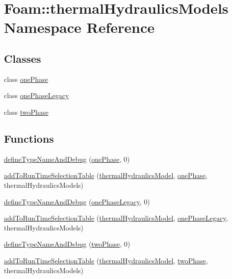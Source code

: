 \hypertarget{namespaceFoam_1_1thermalHydraulicsModels}{}\section{Foam\+:\+:thermal\+Hydraulics\+Models Namespace Reference}
\label{namespaceFoam_1_1thermalHydraulicsModels}
\subsection*{Classes}
\begin{DoxyCompactItemize}
\item 
class \hyperlink{classFoam_1_1thermalHydraulicsModels_1_1onePhase}{one\+Phase}
\item 
class \hyperlink{classFoam_1_1thermalHydraulicsModels_1_1onePhaseLegacy}{one\+Phase\+Legacy}
\item 
class \hyperlink{classFoam_1_1thermalHydraulicsModels_1_1twoPhase}{two\+Phase}
\end{DoxyCompactItemize}
\subsection*{Functions}
\begin{DoxyCompactItemize}
\item 
\hyperlink{namespaceFoam_1_1thermalHydraulicsModels_a3eb0fd84f7fb16a851ba94442762080c}{define\+Type\+Name\+And\+Debug} (\hyperlink{classFoam_1_1thermalHydraulicsModels_1_1onePhase}{one\+Phase}, 0)
\item 
\hyperlink{namespaceFoam_1_1thermalHydraulicsModels_a55e34558094e1b6bbe1955c67027a868}{add\+To\+Run\+Time\+Selection\+Table} (\hyperlink{classFoam_1_1thermalHydraulicsModel}{thermal\+Hydraulics\+Model}, \hyperlink{classFoam_1_1thermalHydraulicsModels_1_1onePhase}{one\+Phase}, thermal\+Hydraulics\+Models)
\item 
\hyperlink{namespaceFoam_1_1thermalHydraulicsModels_a9176fb4126e0722a232dda1031c32575}{define\+Type\+Name\+And\+Debug} (\hyperlink{classFoam_1_1thermalHydraulicsModels_1_1onePhaseLegacy}{one\+Phase\+Legacy}, 0)
\item 
\hyperlink{namespaceFoam_1_1thermalHydraulicsModels_a9cfa96fcaf4205427a247594c76f0a26}{add\+To\+Run\+Time\+Selection\+Table} (\hyperlink{classFoam_1_1thermalHydraulicsModel}{thermal\+Hydraulics\+Model}, \hyperlink{classFoam_1_1thermalHydraulicsModels_1_1onePhaseLegacy}{one\+Phase\+Legacy}, thermal\+Hydraulics\+Models)
\item 
\hyperlink{namespaceFoam_1_1thermalHydraulicsModels_abf399190a7b7dfe7588650a11fa43cfd}{define\+Type\+Name\+And\+Debug} (\hyperlink{classFoam_1_1thermalHydraulicsModels_1_1twoPhase}{two\+Phase}, 0)
\item 
\hyperlink{namespaceFoam_1_1thermalHydraulicsModels_adc087b6eeecc67c9cbf276536db316da}{add\+To\+Run\+Time\+Selection\+Table} (\hyperlink{classFoam_1_1thermalHydraulicsModel}{thermal\+Hydraulics\+Model}, \hyperlink{classFoam_1_1thermalHydraulicsModels_1_1twoPhase}{two\+Phase}, thermal\+Hydraulics\+Models)
\end{DoxyCompactItemize}


